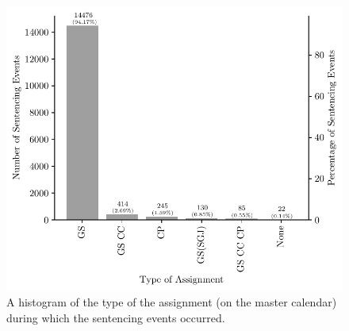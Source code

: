 \documentclass[11pt, oneside]{article}   	%
\theoremstyle{ModifiedStyle}
\begin{document}
\begin{figure}[H]
	\centering
	\includegraphics[scale=0.75]{Figures/Type_of_Court_Assignment_Sentencing_Event_Histogram}
	\caption{A histogram of the type of the assignment (on the master calendar) during which the sentencing events occurred.}
	\label{Figure_Assignment_Type_Sentencing_Event_Histogram}
\end{figure}
\end{document}
